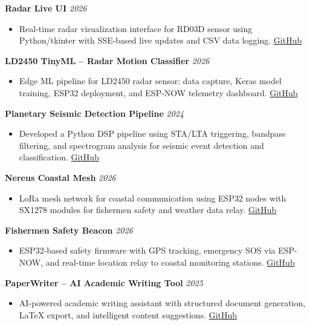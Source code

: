 \documentclass[10pt,a4paper]{article}
\newcommand{\role}[2]{\textbf{#1} \hfill \textit{#2}}
\begin{document}
\role{Radar Live UI}{2026}
\begin{itemize}
    \item Real-time radar visualization interface for RD03D sensor using Python/tkinter with SSE-based live updates and CSV data logging. \href{https://github.com/vass112/radar-live-ui}{GitHub}
\end{itemize}

\role{LD2450 TinyML -- Radar Motion Classifier}{2026}
\begin{itemize}
    \item Edge ML pipeline for LD2450 radar sensor: data capture, Keras model training, ESP32 deployment, and ESP-NOW telemetry dashboard. \href{https://github.com/vass112/ld2450-tinyml}{GitHub}
\end{itemize}

\role{Planetary Seismic Detection Pipeline}{2024}
\begin{itemize}
    \item Developed a Python DSP pipeline using STA/LTA triggering, bandpass filtering, and spectrogram analysis for seismic event detection and classification. \href{https://github.com/vass112/seismic-detection-ml}{GitHub}
\end{itemize}

\role{Nereus Coastal Mesh}{2026}
\begin{itemize}
    \item LoRa mesh network for coastal communication using ESP32 nodes with SX1278 modules for fishermen safety and weather data relay. \href{https://github.com/vass112/nereus-coastal-mesh}{GitHub}
\end{itemize}

\role{Fishermen Safety Beacon}{2026}
\begin{itemize}
    \item ESP32-based safety firmware with GPS tracking, emergency SOS via ESP-NOW, and real-time location relay to coastal monitoring stations. \href{https://github.com/vass112/fishermen-firmware}{GitHub}
\end{itemize}

\role{PaperWriter -- AI Academic Writing Tool}{2025}
\begin{itemize}
    \item AI-powered academic writing assistant with structured document generation, LaTeX export, and intelligent content suggestions. \href{https://github.com/vass112/paperwriter}{GitHub}
\end{itemize}
\end{document}
